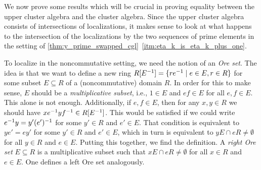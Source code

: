 We now prove some results which will be crucial in proving equality between the upper
cluster algebra and the cluster algebra. Since the upper cluster algebra consists of
intersections of localizations, it makes sense to look at what happens to the
intersection of the localizations by the two sequences of prime elements in the setting
of \cref{thm:y_prime_swapped_cgl}~\ref*{itm:eta_k_is_eta_k_plus_one}.

To localize in the noncommutative setting, we need the notion of an \emph{Ore
	set}. The idea is that we want to define a new ring $R[E^{-1}] = \{re^{-1}
	\mid e \in E, r\in R\}$ for some subset $E \subseteq R$ of a (noncommutative) domain
$R$. In order for this to make sense, $E$ should be a \emph{multiplicative
	subset}, i.e., $1 \in E$ and $ef \in E$ for all $e,f \in
	E$. This alone is not enough. Additionally, if $e, f \in E$, then for any $x, y \in R$
we should have $xe^{-1} yf^{-1} \in R[E^{-1}]$. This would be satisfied if we could write
$e^{-1} y = y' (e')^{-1}$ for some $y' \in R$ and $e' \in E$. That condition is
equivalent to $y e' = e y'$ for some $y' \in R$ and $e' \in E$, which in turn is
equivalent to $y E \cap e R \neq \emptyset$ for all $y \in R$ and $e \in E$. Putting
this together, we find the definition. A \emph{right Ore set} $E \subseteq R$ is a
multiplicative subset such that $x E \cap e R \neq \emptyset$ for all $x \in R$ and $e
	\in E$. One defines a left Ore set analogously.

